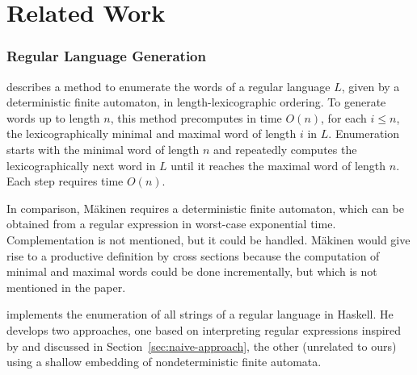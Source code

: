 \section{Related Work}
\label{sec:related-work}

\subsubsection*{Regular Language Generation}

\citet{DBLP:journals/actaC/Makinen97} describes a method to enumerate
the words of a regular language $L$, given by a deterministic finite
automaton, in length-lexicographic ordering. To generate words up to
length $n$, this method precomputes in time $O(n)$, for each $i\le n$,
the lexicographically minimal and maximal word of length $i$ in $L$.
%
Enumeration starts with the minimal word of
length $n$ and repeatedly computes the lexicographically next word in $L$
until it reaches the maximal word of length $n$. Each step requires time $O(n)$. 


In comparison, M{\"{a}}kinen requires a deterministic
finite automaton, which can be obtained from a regular expression in
worst-case exponential time. Complementation is not mentioned, but it
could be handled. M{\"{a}}kinen would give rise to a
productive definition by cross sections because the computation of minimal
and maximal words could be done incrementally, but which is not mentioned
in the paper.


\citet{DBLP:journals/jfp/McIlroy04} implements the enumeration of all
strings of a regular language in Haskell. He develops two approaches,
one based on interpreting regular expressions inspired by
\citet{misra11:_enumer_strin_regul_expres} and discussed in
Section~\ref{sec:naive-approach}, the other (unrelated to ours) using
a shallow embedding of nondeterministic finite automata.



